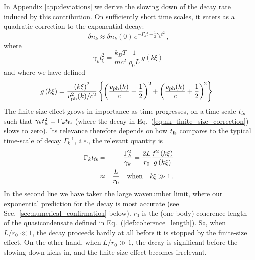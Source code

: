 \documentclass[aps,prd,notitlepage,amsfonts,amssymb,amsmath,nofootinbib,superscriptaddress,longbibliography]{revtex4-2}
\begin{document}
In Appendix \ref{app:deviations} we derive the slowing down of the decay rate induced by this contribution. On sufficiently short time scales, it enters as a quadratic correction to the exponential decay:
\begin{equation}
	\delta n_{k} \approx \delta n_{k}(0) \, e^{-\Gamma_{k}t + \frac{1}{2} \gamma_{k} t^{2}} \, ,
	\label{eq:nk_finite_size_correction}
\end{equation}
where 
\begin{equation}
	\label{def:prediction_small_gamma}
	\gamma_{k} t_{\xi}^2  = \frac{k_{B}T}{mc^{2}} \, \frac{1}{\rho_{0}L} \, g \left(k \xi\right)\,
\end{equation}
and where we have defined
\begin{equation}
	g\left(k\xi\right) = \frac{\left(k\xi\right)^{2}}{v_{\rm ph}^{2}(k)/c^{2}}  \left\{ \left(\frac{v_{\rm ph}(k) }{c} - \frac{1}{2}\right)^{2} + \left(\frac{v_{\rm ph}(k) }{c} + \frac{1}{2}\right)^{2} \right\}  \,.
\end{equation}
The finite-size effect grows in importance as time progresses, 
on a time scale $t_{\rm fs}$ such that $\gamma_{k} t_{\rm fs}^{2} = \Gamma_{k} t_{\rm fs}$ (where the decay in Eq.~(\ref{eq:nk_finite_size_correction}) slows to zero).
Its relevance therefore depends on how $t_{\rm fs}$ compares to the typical time-scale of decay $\Gamma_k^{-1}$, {\it i.e.}, the relevant quantity is
\begin{eqnarray}
\label{eq:relevant_finite_size}
\Gamma_{k} t_{\rm fs} &=& \frac{\Gamma_{k}^{2}}{\gamma_{k}} = \frac{2 L}{r_{0}}  \frac{f^2\left(k\xi\right)}{g\left(k\xi\right)} \nonumber \\
&\approx& \frac{L}{r_{0}} \quad {\rm when} \quad k\xi \gg 1 \,.
\end{eqnarray}
In the second line we have taken the large wavenumber limit,
where our exponential prediction for the decay is most accurate (see Sec.~\ref{sec:numerical_confirmation} below).  $r_0$ 
is the (one-body) coherence length of the quasicondensate defined in Eq.~(\ref{def:coherence_length}).  So, when $L/r_{0} \ll 1$, the decay proceeds hardly at all before it is stopped by the finite-size effect.  On the other hand, when $L/r_{0} \gg 1$, the decay is significant before the slowing-down kicks in, and the finite-size effect becomes irrelevant.
\end{document}
